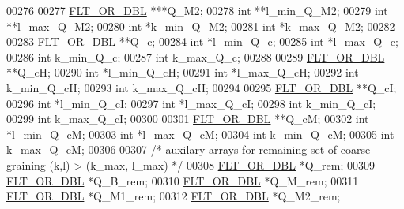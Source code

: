 \begin{DoxyCode}
00276 
00277       \hyperlink{group__data__structures_ga31125aeace516926bf7f251f759b6126}{FLT\_OR\_DBL}      ***Q\_M2;
00278       \textcolor{keywordtype}{int}             **l\_min\_Q\_M2;
00279       \textcolor{keywordtype}{int}             **l\_max\_Q\_M2;
00280       \textcolor{keywordtype}{int}             *k\_min\_Q\_M2;
00281       \textcolor{keywordtype}{int}             *k\_max\_Q\_M2;
00282 
00283       \hyperlink{group__data__structures_ga31125aeace516926bf7f251f759b6126}{FLT\_OR\_DBL}      **Q\_c;
00284       \textcolor{keywordtype}{int}             *l\_min\_Q\_c;
00285       \textcolor{keywordtype}{int}             *l\_max\_Q\_c;
00286       \textcolor{keywordtype}{int}             k\_min\_Q\_c;
00287       \textcolor{keywordtype}{int}             k\_max\_Q\_c;
00288 
00289       \hyperlink{group__data__structures_ga31125aeace516926bf7f251f759b6126}{FLT\_OR\_DBL}      **Q\_cH;
00290       \textcolor{keywordtype}{int}             *l\_min\_Q\_cH;
00291       \textcolor{keywordtype}{int}             *l\_max\_Q\_cH;
00292       \textcolor{keywordtype}{int}             k\_min\_Q\_cH;
00293       \textcolor{keywordtype}{int}             k\_max\_Q\_cH;
00294 
00295       \hyperlink{group__data__structures_ga31125aeace516926bf7f251f759b6126}{FLT\_OR\_DBL}      **Q\_cI;
00296       \textcolor{keywordtype}{int}             *l\_min\_Q\_cI;
00297       \textcolor{keywordtype}{int}             *l\_max\_Q\_cI;
00298       \textcolor{keywordtype}{int}             k\_min\_Q\_cI;
00299       \textcolor{keywordtype}{int}             k\_max\_Q\_cI;
00300 
00301       \hyperlink{group__data__structures_ga31125aeace516926bf7f251f759b6126}{FLT\_OR\_DBL}      **Q\_cM;
00302       \textcolor{keywordtype}{int}             *l\_min\_Q\_cM;
00303       \textcolor{keywordtype}{int}             *l\_max\_Q\_cM;
00304       \textcolor{keywordtype}{int}             k\_min\_Q\_cM;
00305       \textcolor{keywordtype}{int}             k\_max\_Q\_cM;
00306 
00307       \textcolor{comment}{/* auxilary arrays for remaining set of coarse graining (k,l) > (k\_max, l\_max) */}
00308       \hyperlink{group__data__structures_ga31125aeace516926bf7f251f759b6126}{FLT\_OR\_DBL}      *Q\_rem;
00309       \hyperlink{group__data__structures_ga31125aeace516926bf7f251f759b6126}{FLT\_OR\_DBL}      *Q\_B\_rem;
00310       \hyperlink{group__data__structures_ga31125aeace516926bf7f251f759b6126}{FLT\_OR\_DBL}      *Q\_M\_rem;
00311       \hyperlink{group__data__structures_ga31125aeace516926bf7f251f759b6126}{FLT\_OR\_DBL}      *Q\_M1\_rem;
00312       \hyperlink{group__data__structures_ga31125aeace516926bf7f251f759b6126}{FLT\_OR\_DBL}      *Q\_M2\_rem;

\end{DoxyCode}
